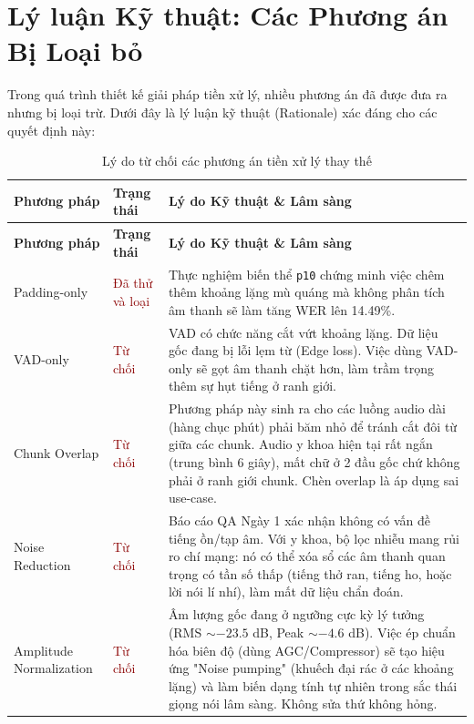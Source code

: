 \documentclass[12pt,a4paper]{article}
\begin{document}
\section{Lý luận Kỹ thuật: Các Phương án Bị Loại bỏ}

Trong quá trình thiết kế giải pháp tiền xử lý, nhiều phương án đã được đưa ra nhưng bị loại trừ. Dưới đây là lý luận kỹ thuật (Rationale) xác đáng cho các quyết định này:

\begin{longtable}{|p{3.5cm}|p{3cm}|p{8.5cm}|}
\caption{Lý do từ chối các phương án tiền xử lý thay thế}\\
\hline
\textbf{Phương pháp} & \textbf{Trạng thái} & \textbf{Lý do Kỹ thuật \& Lâm sàng} \\
\hline
\endfirsthead

\hline
\textbf{Phương pháp} & \textbf{Trạng thái} & \textbf{Lý do Kỹ thuật \& Lâm sàng} \\
\hline
\endhead

Padding-only & \textcolor{darkred}{Đã thử và loại} & Thực nghiệm biến thể \texttt{p10} chứng minh việc chêm thêm khoảng lặng mù quáng mà không phân tích âm thanh sẽ làm tăng WER lên 14.49\%. \\
\hline
VAD-only & \textcolor{darkred}{Từ chối} & VAD có chức năng cắt vứt khoảng lặng. Dữ liệu gốc đang bị lỗi lẹm từ (Edge loss). Việc dùng VAD-only sẽ gọt âm thanh chặt hơn, làm trầm trọng thêm sự hụt tiếng ở ranh giới. \\
\hline
Chunk Overlap & \textcolor{darkred}{Từ chối} & Phương pháp này sinh ra cho các luồng audio dài (hàng chục phút) phải băm nhỏ để tránh cắt đôi từ giữa các chunk. Audio y khoa hiện tại rất ngắn (trung bình 6 giây), mất chữ ở 2 đầu gốc chứ không phải ở ranh giới chunk. Chèn overlap là áp dụng sai use-case. \\
\hline
Noise Reduction & \textcolor{darkred}{Từ chối} & Báo cáo QA Ngày 1 xác nhận không có vấn đề tiếng ồn/tạp âm. Với y khoa, bộ lọc nhiễu mang rủi ro chí mạng: nó có thể xóa sổ các âm thanh quan trọng có tần số thấp (tiếng thở ran, tiếng ho, hoặc lời nói lí nhí), làm mất dữ liệu chẩn đoán. \\
\hline
Amplitude Normalization & \textcolor{darkred}{Từ chối} & Âm lượng gốc đang ở ngưỡng cực kỳ lý tưởng (RMS $\sim -23.5$ dB, Peak $\sim -4.6$ dB). Việc ép chuẩn hóa biên độ (dùng AGC/Compressor) sẽ tạo hiệu ứng "Noise pumping" (khuếch đại rác ở các khoảng lặng) và làm biến dạng tính tự nhiên trong sắc thái giọng nói lâm sàng. Không sửa thứ không hỏng. \\
\hline
\end{longtable}
\end{document}
